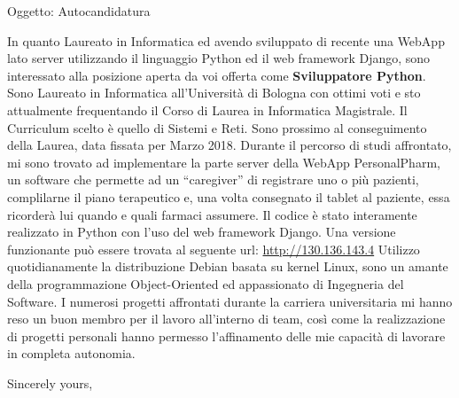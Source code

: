 %
%
%
%
%
%



\clearpage


\date{\today}

\opening{Oggetto: Autocandidatura}

\makelettertitle

In quanto Laureato in Informatica ed avendo sviluppato di recente una WebApp
lato server utilizzando il linguaggio Python ed il web framework Django, sono
interessato alla posizione aperta da voi offerta come \textbf{Sviluppatore
Python}.\newline
\newline
Sono Laureato in Informatica all'Università di Bologna con ottimi voti e sto
attualmente frequentando il Corso di Laurea in Informatica Magistrale. Il
Curriculum scelto è quello di Sistemi e Reti. Sono prossimo al conseguimento
della Laurea, data fissata per Marzo 2018.\newline
\newline
Durante il percorso di studi affrontato, mi sono trovato ad implementare la
parte server della WebApp PersonalPharm, un software che permette ad un
``caregiver'' di registrare uno o più pazienti, complilarne il piano terapeutico
e, una volta consegnato il tablet al paziente, essa ricorderà lui quando e quali
farmaci assumere. Il codice è stato interamente realizzato in Python con l'uso
del web framework Django. Una versione funzionante può essere trovata al
seguente url: \url{http://130.136.143.4}\newline
\newline
Utilizzo quotidianamente la distribuzione Debian basata su kernel Linux, sono un
amante della programmazione Object-Oriented ed appassionato di Ingegneria del
Software. I numerosi progetti affrontati durante la carriera universitaria mi
hanno reso un buon membro per il lavoro all'interno di team, così come la
realizzazione di progetti personali hanno permesso l'affinamento delle mie
capacità di lavorare in completa autonomia.

\closing{Sincerely yours,}


\makeletterclosing

\newpage
